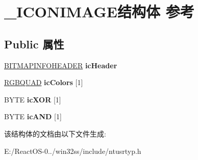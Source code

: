 \hypertarget{struct___i_c_o_n_i_m_a_g_e}{}\section{\+\_\+\+I\+C\+O\+N\+I\+M\+A\+G\+E结构体 参考}
\label{struct___i_c_o_n_i_m_a_g_e}
\subsection*{Public 属性}
\begin{DoxyCompactItemize}
\item 
\mbox{\label{struct___i_c_o_n_i_m_a_g_e_acd105ae64ed8c92bd71484634c43dc97}} 
\hyperlink{struct_b_i_t_m_a_p_i_n_f_o_h_e_a_d_e_r}{B\+I\+T\+M\+A\+P\+I\+N\+F\+O\+H\+E\+A\+D\+ER} {\bfseries ic\+Header}
\item 
\mbox{\label{struct___i_c_o_n_i_m_a_g_e_a5150d9271f59b23ba279e0a06d090b52}} 
\hyperlink{structtag_r_g_b_q_u_a_d}{R\+G\+B\+Q\+U\+AD} {\bfseries ic\+Colors} \mbox{[}1\mbox{]}
\item 
\mbox{\label{struct___i_c_o_n_i_m_a_g_e_a22df21b28a641261ac512bd1c9bd09e5}} 
B\+Y\+TE {\bfseries ic\+X\+OR} \mbox{[}1\mbox{]}
\item 
\mbox{\label{struct___i_c_o_n_i_m_a_g_e_a1b790abae62d2575865c0a558023674f}} 
B\+Y\+TE {\bfseries ic\+A\+ND} \mbox{[}1\mbox{]}
\end{DoxyCompactItemize}


该结构体的文档由以下文件生成\+:\begin{DoxyCompactItemize}
\item 
E\+:/\+React\+O\+S-\/0../win32ss/include/ntusrtyp.\+h\end{DoxyCompactItemize}
